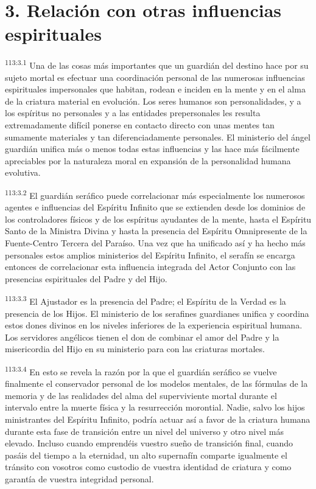 \section*{3. Relación con otras influencias espirituales}
\par
\textsuperscript{113:3.1} Una de las cosas más importantes que un guardián del destino hace por su sujeto mortal es efectuar una coordinación personal de las numerosas influencias espirituales impersonales que habitan, rodean e inciden en la mente y en el alma de la criatura material en evolución. Los seres humanos son personalidades, y a los espíritus no personales y a las entidades prepersonales les resulta extremadamente difícil ponerse en contacto directo con unas mentes tan sumamente materiales y tan diferenciadamente personales. El ministerio del ángel guardián unifica más o menos todas estas influencias y las hace más fácilmente apreciables por la naturaleza moral en expansión de la personalidad humana evolutiva.

\par
\textsuperscript{113:3.2} El guardián seráfico puede correlacionar más especialmente los numerosos agentes e influencias del Espíritu Infinito que se extienden desde los dominios de los controladores físicos y de los espíritus ayudantes de la mente, hasta el Espíritu Santo de la Ministra Divina y hasta la presencia del Espíritu Omnipresente de la Fuente-Centro Tercera del Paraíso. Una vez que ha unificado así y ha hecho más personales estos amplios ministerios del Espíritu Infinito, el serafín se encarga entonces de correlacionar esta influencia integrada del Actor Conjunto con las presencias espirituales del Padre y del Hijo.

\par
\textsuperscript{113:3.3} El Ajustador es la presencia del Padre; el Espíritu de la Verdad es la presencia de los Hijos. El ministerio de los serafines guardianes unifica y coordina estos dones divinos en los niveles inferiores de la experiencia espiritual humana. Los servidores angélicos tienen el don de combinar el amor del Padre y la misericordia del Hijo en su ministerio para con las criaturas mortales.

\par
\textsuperscript{113:3.4} En esto se revela la razón por la que el guardián seráfico se vuelve finalmente el conservador personal de los modelos mentales, de las fórmulas de la memoria y de las realidades del alma del superviviente mortal durante el intervalo entre la muerte física y la resurrección morontial. Nadie, salvo los hijos ministrantes del Espíritu Infinito, podría actuar así a favor de la criatura humana durante esta fase de transición entre un nivel del universo y otro nivel más elevado. Incluso cuando emprendéis vuestro sueño de transición final, cuando pasáis del tiempo a la eternidad, un alto supernafín comparte igualmente el tránsito con vosotros como custodio de vuestra identidad de criatura y como garantía de vuestra integridad personal.

